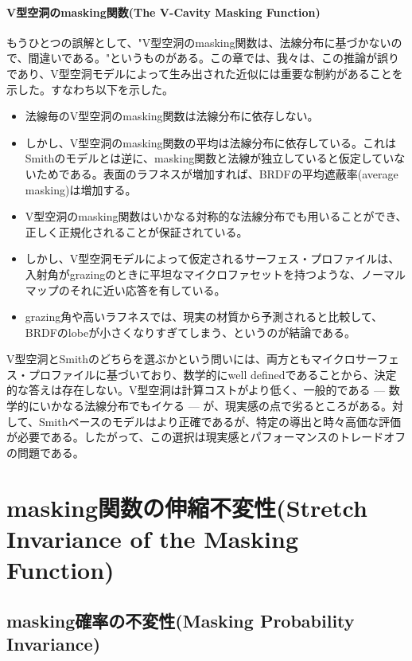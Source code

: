 \documentclass[a4j,xelatex,ja=standard]{bxjsarticle}
\begin{document}
\paragraph{V型空洞のmasking関数(The V-Cavity Masking Function)}

もうひとつの誤解として、"V型空洞のmasking関数は、法線分布に基づかないので、間違いである。"というものがある。この章では、我々は、この推論が誤りであり、V型空洞モデルによって生み出された近似には重要な制約があることを示した。すなわち以下を示した。

\begin{itemize}
    \item 法線毎のV型空洞のmasking関数は法線分布に依存しない。
    \item しかし、V型空洞のmasking関数の平均は法線分布に依存している。これはSmithのモデルとは逆に、masking関数と法線が独立していると仮定していないためである。表面のラフネスが増加すれば、BRDFの平均遮蔽率(average masking)は増加する。
    \item V型空洞のmasking関数はいかなる対称的な法線分布でも用いることができ、正しく正規化されることが保証されている。
    \item しかし、V型空洞モデルによって仮定されるサーフェス・プロファイルは、入射角がgrazingのときに平坦なマイクロファセットを持つような、ノーマルマップのそれに近い応答を有している。
    \item grazing角や高いラフネスでは、現実の材質から予測されると比較して、BRDFのlobeが小さくなりすぎてしまう、というのが結論である。
\end{itemize}

V型空洞とSmithのどちらを選ぶかという問いには、両方ともマイクロサーフェス・プロファイルに基づいており、数学的にwell definedであることから、決定的な答えは存在しない。V型空洞は計算コストがより低く、一般的である --- 数学的にいかなる法線分布でもイケる --- が、現実感の点で劣るところがある。対して、Smithベースのモデルはより正確であるが、特定の導出と時々高価な評価が必要である。したがって、この選択は現実感とパフォーマンスのトレードオフの問題である。

\section{masking関数の伸縮不変性(Stretch Invariance of the Masking Function)}

\subsection{masking確率の不変性(Masking Probability Invariance)}
\end{document}
